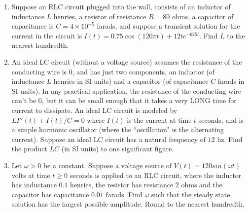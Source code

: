 \documentclass{ximera}
\begin{document}
\begin{enumerate}[label=(\arabic*)]
\newpage


\item  Suppose an RLC circuit plugged into the wall, consists of an inductor of inductance $L$ henries, a resistor of resistance $R=80$ ohms, a capacitor of capacitance is $C=4\times 10^{-5}$ farads, and suppose a transient solution for the current in the circuit is $I(t)=0.75 \cos{(120\pi t)}+12te^{-625t}$.  Find $L$ to the nearest hundredth.







\item An ideal LC circuit (without a voltage source) assumes the resistance of the conducting wire is $0$, and has just two components, an inductor (of inductance $L$ henries in SI units) and a capacitor (of capacitance $C$ farads in SI units).  In any practical application, the resistance of the conducting wire can't be $0$, but it can be small enough that it takes a very LONG time for current to dissipate.  An ideal LC circuit is modeled by $LI''(t)+I(t)/C=0$ where $I(t)$ is the current at time $t$ seconds, and is a simple harmonic oscillator (where the ``oscillation" is the alternating current).  Suppose an ideal LC circuit has a natural frequency of $12$ hz.  Find the product $LC$ (in SI units) to one significant figure.




\item Let $\omega>0$ be a constant. Suppose a voltage source of $V(t)=120 sin(\omega t)$ volts at time $t\geq 0$ seconds is applied to an RLC circuit, where the inductor has inductance $0.1$ henries, the resistor has resistance $2$ ohms and the capacitor has capacitance $0.01$ farads.  Find $\omega$ such that the steady state solution has the largest possible amplitude.  Round to the nearest hundredth.






\end{enumerate}
\end{document}
